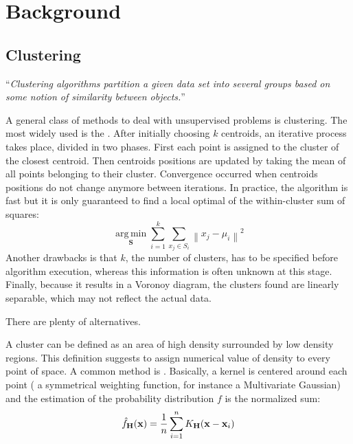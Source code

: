 \chapter{Background}
\label{ch:background}

\section{Clustering}

\enquote{\emph{Clustering algorithms partition a given data set into several groups based on some notion of similarity between objects.}}

A general class of methods to deal with unsupervised problems is clustering. The most widely used is the  \autocite{kmeans67}. After initially choosing $k$ centroids, an iterative process takes place, divided in two phases. First each point is assigned to the cluster of the closest centroid. Then centroids positions are updated by taking the mean of all points belonging to their cluster. Convergence occurred when centroids positions do not change anymore between iterations. In practice, the algorithm is fast but it is only guaranteed to find a local optimal of the within-cluster sum of squares: \[ \underset{\mathbf{S}} {\operatorname{arg\,min}}  \sum_{i=1}^{k} \sum_{ x_j \in S_i} \left\| x_j - \mu_i \right\|^2 \] Another drawbacks is that $k$, the number of clusters, has to be specified before algorithm execution, whereas this information is often unknown at this stage. Finally, because it results in a Voronoy diagram, the clusters found are linearly separable, which may not reflect the actual data.

There are plenty of alternatives.

A cluster can be defined as an area of high density surrounded by low density regions. This definition suggests to assign numerical value of density to every point of space. A common method is   \autocite{KDE56}. Basically, a kernel is centered around each point (\ie{} a symmetrical weighting function, for instance a Multivariate Gaussian) and the estimation of the probability distribution $f$ is the normalized sum:
\[ \hat{f}_\bold{H}(\bold{x})= \frac{1}{n} \sum_{i=1}^n K_\bold{H} (\bold{x} - \bold{x}_i) \]

